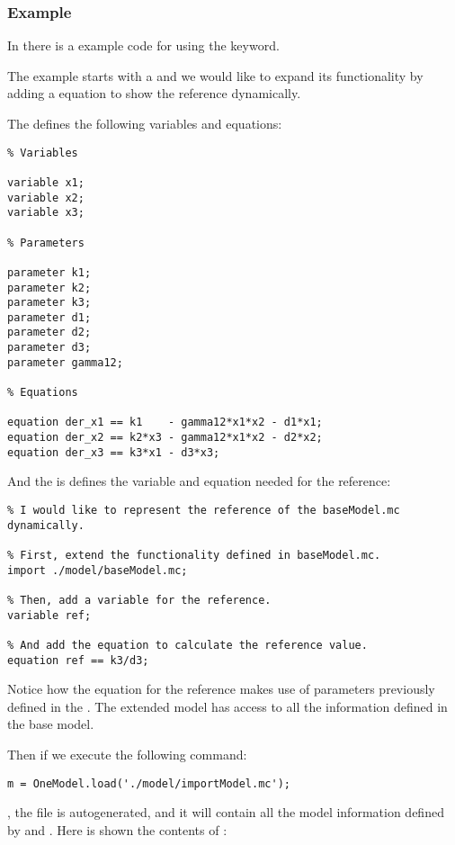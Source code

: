 \documentclass[11pt]{article}
\begin{document}
\subsubsection{Example}

In  there is a example code for using the  keyword.

The example starts with a  and we would like to expand its functionality by adding a equation to show the reference dynamically.

The  defines the following variables and equations:

\begin{lstlisting}
% Variables

variable x1;
variable x2;
variable x3;

% Parameters

parameter k1;
parameter k2;
parameter k3;
parameter d1;
parameter d2;
parameter d3;
parameter gamma12;

% Equations

equation der_x1 == k1    - gamma12*x1*x2 - d1*x1;
equation der_x2 == k2*x3 - gamma12*x1*x2 - d2*x2;
equation der_x3 == k3*x1 - d3*x3;
\end{lstlisting}

And the  is defines the variable and equation needed for the reference:

\begin{lstlisting}
% I would like to represent the reference of the baseModel.mc dynamically.

% First, extend the functionality defined in baseModel.mc.
import ./model/baseModel.mc;

% Then, add a variable for the reference.
variable ref;

% And add the equation to calculate the reference value.
equation ref == k3/d3;
\end{lstlisting}

Notice how the equation for the reference  makes use of parameters previously defined in the . The extended model has access to all the information defined in the base model.

Then if we execute the following command:

\begin{lstlisting}
m = OneModel.load('./model/importModel.mc');
\end{lstlisting}

, the file  is autogenerated, and it will contain all the model information defined by  and . Here is shown the contents of :
\end{document}
